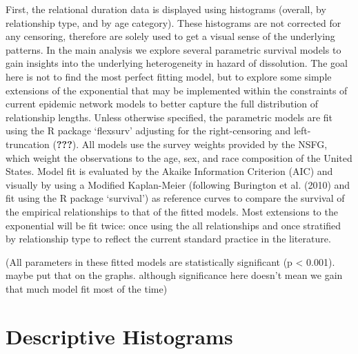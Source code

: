 \documentclass [11pt, proquest] {uwthesis}[2015/03/03]
\begin{document}
First, the relational duration data is displayed using histograms
(overall, by relationship type, and by age category). These histograms
are not corrected for any censoring, therefore are solely used to get a
visual sense of the underlying patterns. In the main analysis we explore
several parametric survival models to gain insights into the underlying
heterogeneity in hazard of dissolution. The goal here is not to find the
most perfect fitting model, but to explore some simple extensions of the
exponential that may be implemented within the constraints of current
epidemic network models to better capture the full distribution of
relationship lengths. Unless otherwise specified, the parametric models
are fit using the R package `flexsurv' adjusting for the right-censoring
and left-truncation ({\textbf{???}}). All models use the survey weights
provided by the NSFG, which weight the observations to the age, sex, and
race composition of the United States. Model fit is evaluated by the
Akaike Information Criterion (AIC) and visually by using a Modified
Kaplan-Meier (following Burington et al. (2010) and fit using the R
package `survival') as reference curves to compare the survival of the
empirical relationships to that of the fitted models. Most extensions to
the exponential will be fit twice: once using the all relationships and
once stratified by relationship type to reflect the current standard
practice in the literature.

(All parameters in these fitted models are statistically significant (p
\textless{} 0.001). maybe put that on the graphs. although significance
here doesn't mean we gain that much model fit most of the time)

\section{Descriptive Histograms}\label{descriptive-histograms}
\end{document}
